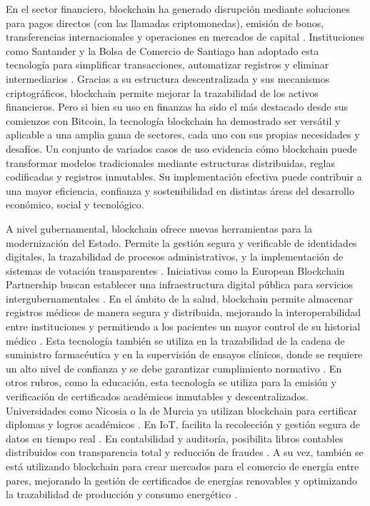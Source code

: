 En el sector financiero, blockchain ha generado disrupción mediante soluciones para pagos directos (con las llamadas criptomonedas), emisión de bonos, transferencias internacionales y operaciones en mercados de capital \cite{bartolomeo2020introduccion}. Instituciones como Santander y la Bolsa de Comercio de Santiago han adoptado esta tecnología para simplificar transacciones, automatizar registros y eliminar intermediarios \cite{bartolomeo2020introduccion}. Gracias a su estructura descentralizada y sus mecanismos criptográficos, blockchain permite mejorar la trazabilidad de los activos financieros. Pero si bien su uso en finanzas ha sido el más destacado desde sus comienzos con Bitcoin, la tecnología blockchain ha demostrado ser versátil y aplicable a una amplia gama de sectores, cada uno con sus propias necesidades y desafíos. Un conjunto de variados casos de uso evidencia cómo blockchain puede transformar modelos tradicionales mediante estructuras distribuidas, reglas codificadas y registros inmutables. Su implementación efectiva puede contribuir a una mayor eficiencia, confianza y sostenibilidad en distintas áreas del desarrollo económico, social y tecnológico.

A nivel gubernamental, blockchain ofrece nuevas herramientas para la modernización del Estado. Permite la gestión segura y verificable de identidades digitales, la trazabilidad de procesos administrativos, y la implementación de sistemas de votación transparentes \cite{vaigandla2023review}. Iniciativas como la European Blockchain Partnership buscan establecer una infraestructura digital pública para servicios intergubernamentales \cite{diez2023web}. En el ámbito de la salud, blockchain permite almacenar registros médicos de manera segura y distribuida, mejorando la interoperabilidad entre instituciones y permitiendo a los pacientes un mayor control de su historial médico \cite{sunny2022systematic}. Esta tecnología también se utiliza en la trazabilidad de la cadena de suministro farmacéutica y en la supervisión de ensayos clínicos, donde se requiere un alto nivel de confianza y se debe garantizar cumplimiento normativo \cite{vaigandla2023review}. En otros rubros, como la educación, esta tecnología se utiliza para la emisión y verificación de certificados académicos inmutables y descentralizados. Universidades como Nicosia o la de Murcia ya utilizan blockchain para certificar diplomas y logros académicos \cite{diez2023web}. En IoT, facilita la recolección y gestión segura de datos en tiempo real \cite{sunny2022systematic}. En contabilidad y auditoría, posibilita libros contables distribuidos con transparencia total y reducción de fraudes \cite{bartolomeo2020introduccion}. A su vez, también se está utilizando blockchain para crear mercados para el comercio de energía entre pares, mejorando la gestión de certificados de energías renovables y optimizando la trazabilidad de producción y consumo energético \cite{sunny2022systematic, vaigandla2023review}.

